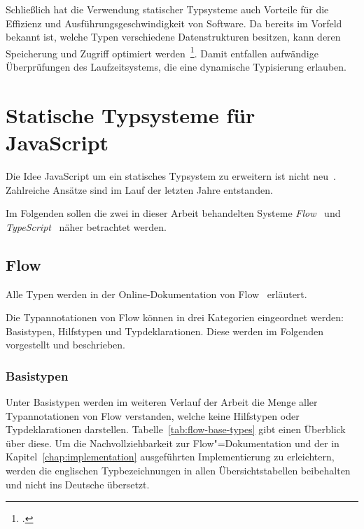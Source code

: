 Schließlich hat die Verwendung statischer Typsysteme auch Vorteile für die Effizienz und Ausführungsgeschwindigkeit von Software. Da bereits im Vorfeld bekannt ist, welche Typen verschiedene Datenstrukturen besitzen, kann deren Speicherung und Zugriff optimiert werden~\footcite[Abschnitt 6.1.3]{MITCHELL:CONCEPTS}. Damit entfallen aufwändige Überprüfungen des Laufzeitsystems, die eine dynamische Typisierung erlauben.


\section{Statische Typsysteme für JavaScript}

Die Idee JavaScript um ein statisches Typsystem zu erweitern ist nicht neu~\autocite[2]{FLOW:PAPER}. Zahlreiche Ansätze sind im Lauf der letzten Jahre entstanden.



Im Folgenden sollen die zwei in dieser Arbeit behandelten Systeme \textit{Flow}~\autocite{FLOW:PAPER} und \textit{TypeScript}~\autocite{TYPESCRIPT_SPEC} näher betrachtet werden.

\subsection{Flow}
\label{subsection:flow}

Alle Typen werden in der Online-Dokumentation von Flow~\autocite{FLOW:TYPE_ANNOTATIONS} erläutert.

Die Typannotationen von Flow können in drei Kategorien eingeordnet werden: Basistypen, Hilfstypen und Typdeklarationen. Diese werden im Folgenden vorgestellt und beschrieben.

\subsubsection{Basistypen}
\label{subsection:flow:base-types}

Unter Basistypen werden im weiteren Verlauf der Arbeit die Menge aller Typannotationen von Flow verstanden, welche keine Hilfstypen oder Typdeklarationen darstellen. Tabelle~\ref{tab:flow-base-types} gibt einen Überblick über diese. Um die Nachvollziehbarkeit zur Flow"=Dokumentation und der in Kapitel~\ref{chap:implementation} ausgeführten Implementierung zu erleichtern, werden die englischen Typbezeichnungen in allen Übersichtstabellen beibehalten und nicht ins Deutsche übersetzt.

